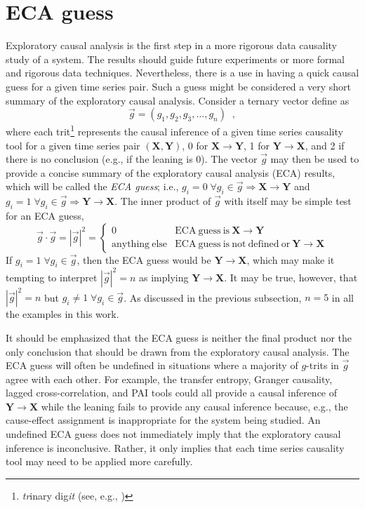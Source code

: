 \section{ECA guess}
Exploratory causal analysis is the first step in a more rigorous data causality study of a system.  The results should guide future experiments or more formal and rigorous data techniques.  Nevertheless, there is a use in having a quick causal guess for a given time series pair.  Such a guess might be considered a very short summary of the exploratory causal analysis.  Consider a ternary vector define as
\begin{equation}
\vec{g} = (g_1,g_2,g_3,\ldots,g_n)\;\;,
\end{equation}
where each trit\footnote{{\em tr}inary dig{\em it} (see, e.g., \cite{Hayes2001})} represents the causal inference of a given time series causality tool for a given time series pair $(\mathbf{X},\mathbf{Y})$, 0 for $\mathbf{X}\rightarrow\mathbf{Y}$, 1 for $\mathbf{Y}\rightarrow\mathbf{X}$, and 2 if there is no conclusion (e.g., if the leaning is 0).  The vector $\vec{g}$ may then be used to provide a concise summary of the exploratory causal analysis (ECA) results, which will be called the {\em ECA guess}; i.e., $g_i = 0\;\forall g_i\in\vec{g}\Rightarrow\mathbf{X}\rightarrow\mathbf{Y}$ and $g_i = 1\;\forall g_i\in\vec{g}\Rightarrow\mathbf{Y}\rightarrow\mathbf{X}$.    The inner product of $\vec{g}$ with itself may be simple test for an ECA guess,
\begin{equation}
\vec{g}\cdot\vec{g} = |\vec{g}|^2 = \left\{
  \begin{array}{lr}
    0 & \mathrm{ECA\ guess\ is\ }\mathbf{X}\rightarrow\mathbf{Y}\\
    \mathrm{anything\ else} & \mathrm{ECA\ guess\ is\ not\ defined\ or\ }\mathbf{Y}\rightarrow\mathbf{X}
  \end{array}
\right.
\end{equation}
If $g_i = 1\;\forall g_i\in\vec{g}$, then the ECA guess would be $\mathbf{Y}\rightarrow\mathbf{X}$, which may make it tempting to interpret $|\vec{g}|^2=n$ as implying $\mathbf{Y}\rightarrow\mathbf{X}$.  It may be true, however, that $|\vec{g}|^2=n$ but $g_i \neq 1\;\forall g_i\in\vec{g}$.  As discussed in the previous subsection, $n=5$ in all the examples in this work.

It should be emphasized that the ECA guess is neither the final product nor the only conclusion that should be drawn from the exploratory causal analysis.  The ECA guess will often be undefined in situations where a majority of $g$-trits in $\vec{g}$ agree with each other.  For example, the transfer entropy, Granger causality, lagged cross-correlation, and PAI tools could all provide a causal inference of $\mathbf{Y}\rightarrow\mathbf{X}$ while the leaning fails to provide any causal inference because, e.g., the cause-effect assignment is inappropriate for the system being studied.  An undefined ECA guess does not immediately imply that the exploratory causal inference is inconclusive.  Rather, it only implies that each time series causality tool may need to be applied more carefully.  

